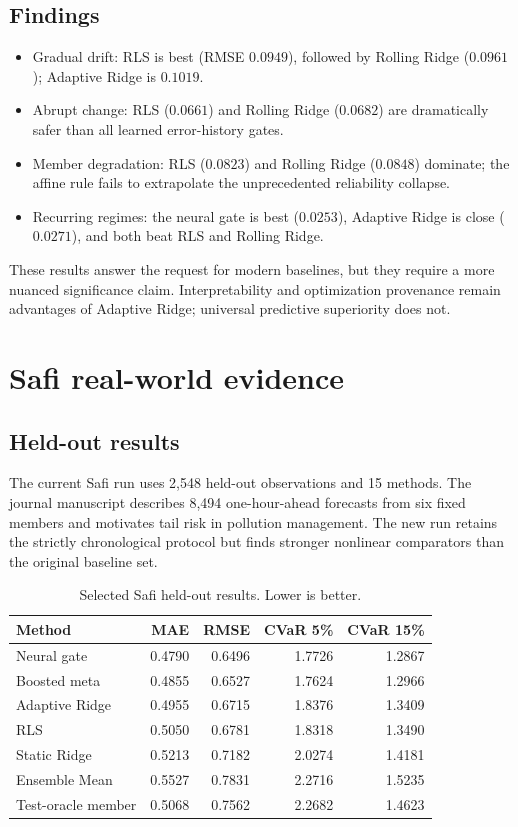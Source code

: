 \documentclass[10pt]{report}
\begin{document}
\section{Findings}
\begin{itemize}
\item Gradual drift: RLS is best (RMSE $0.0949$), followed by Rolling Ridge ($0.0961$); Adaptive Ridge is $0.1019$.
\item Abrupt change: RLS ($0.0661$) and Rolling Ridge ($0.0682$) are dramatically safer than all learned error-history gates.
\item Member degradation: RLS ($0.0823$) and Rolling Ridge ($0.0848$) dominate; the affine rule fails to extrapolate the unprecedented reliability collapse.
\item Recurring regimes: the neural gate is best ($0.0253$), Adaptive Ridge is close ($0.0271$), and both beat RLS and Rolling Ridge.
\end{itemize}
These results answer the request for modern baselines, but they require a more nuanced significance claim. Interpretability and optimization provenance remain advantages of Adaptive Ridge; universal predictive superiority does not.

\chapter{Safi real-world evidence}
\section{Held-out results}
The current Safi run uses 2,548 held-out observations and 15 methods. The journal manuscript describes 8,494 one-hour-ahead forecasts from six fixed members and motivates tail risk in pollution management. The new run retains the strictly chronological protocol but finds stronger nonlinear comparators than the original baseline set.

\begin{table}[H]
\centering
\small
\caption{Selected Safi held-out results. Lower is better.}
\begin{tabular}{lrrrr}
\toprule
Method & MAE & RMSE & CVaR 5\% & CVaR 15\% \\
\midrule
Neural gate & 0.4790 & 0.6496 & 1.7726 & 1.2867 \\
Boosted meta & 0.4855 & 0.6527 & 1.7624 & 1.2966 \\
Adaptive Ridge & 0.4955 & 0.6715 & 1.8376 & 1.3409 \\
RLS & 0.5050 & 0.6781 & 1.8318 & 1.3490 \\
Static Ridge & 0.5213 & 0.7182 & 2.0274 & 1.4181 \\
Ensemble Mean & 0.5527 & 0.7831 & 2.2716 & 1.5235 \\
Test-oracle member & 0.5068 & 0.7562 & 2.2682 & 1.4623 \\
\bottomrule
\end{tabular}
\end{table}
\end{document}
